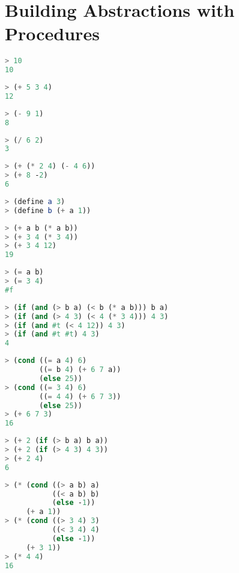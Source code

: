 \chapter{\Large{Building Abstractions with Procedures}}

\begin{lstlisting}[language=Scheme]
> 10
10
\end{lstlisting}
\begin{lstlisting}[language=Scheme]
> (+ 5 3 4)
12
\end{lstlisting}
\begin{lstlisting}[language=Scheme]
> (- 9 1)
8
\end{lstlisting}
\begin{lstlisting}[language=Scheme]
> (/ 6 2)
3
\end{lstlisting}
\begin{lstlisting}[language=Scheme]
> (+ (* 2 4) (- 4 6))
> (+ 8 -2)
6
\end{lstlisting}
\begin{lstlisting}[language=Scheme]
> (define a 3)
> (define b (+ a 1))
\end{lstlisting}
\begin{lstlisting}[language=Scheme]
> (+ a b (* a b))
> (+ 3 4 (* 3 4))
> (+ 3 4 12)
19
\end{lstlisting}
\begin{lstlisting}[language=Scheme]
> (= a b)
> (= 3 4)
#f
\end{lstlisting}
\begin{lstlisting}[language=Scheme]
> (if (and (> b a) (< b (* a b))) b a)
> (if (and (> 4 3) (< 4 (* 3 4))) 4 3)
> (if (and #t (< 4 12)) 4 3)
> (if (and #t #t) 4 3)
4
\end{lstlisting}
\begin{lstlisting}[language=Scheme]
> (cond ((= a 4) 6)
        ((= b 4) (+ 6 7 a))
        (else 25))
> (cond ((= 3 4) 6)
        ((= 4 4) (+ 6 7 3))
        (else 25))
> (+ 6 7 3)
16
\end{lstlisting}
\begin{lstlisting}[language=Scheme]
> (+ 2 (if (> b a) b a))
> (+ 2 (if (> 4 3) 4 3))
> (+ 2 4)
6
\end{lstlisting}
\begin{lstlisting}[language=Scheme]
> (* (cond ((> a b) a)
           ((< a b) b)
           (else -1))
     (+ a 1))
> (* (cond ((> 3 4) 3)
           ((< 3 4) 4)
           (else -1))
     (+ 3 1))
> (* 4 4)
16
\end{lstlisting}


